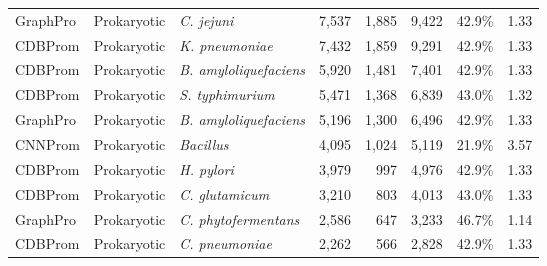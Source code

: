 \begin{longtable}{@{}lllrrrrr@{}}
GraphPro & Prokaryotic & \textit{C. jejuni} & 7,537 & 1,885 & 9,422 & 42.9\% & 1.33 \\
CDBProm & Prokaryotic & \textit{K. pneumoniae} & 7,432 & 1,859 & 9,291 & 42.9\% & 1.33 \\
CDBProm & Prokaryotic & \textit{B. amyloliquefaciens} & 5,920 & 1,481 & 7,401 & 42.9\% & 1.33 \\
CDBProm & Prokaryotic & \textit{S. typhimurium} & 5,471 & 1,368 & 6,839 & 43.0\% & 1.32 \\
GraphPro & Prokaryotic & \textit{B. amyloliquefaciens} & 5,196 & 1,300 & 6,496 & 42.9\% & 1.33 \\
CNNProm & Prokaryotic & \textit{Bacillus} & 4,095 & 1,024 & 5,119 & 21.9\% & 3.57 \\
CDBProm & Prokaryotic & \textit{H. pylori} & 3,979 & 997 & 4,976 & 42.9\% & 1.33 \\
CDBProm & Prokaryotic & \textit{C. glutamicum} & 3,210 & 803 & 4,013 & 43.0\% & 1.33 \\
GraphPro & Prokaryotic & \textit{C. phytofermentans} & 2,586 & 647 & 3,233 & 46.7\% & 1.14 \\
CDBProm & Prokaryotic & \textit{C. pneumoniae} & 2,262 & 566 & 2,828 & 42.9\% & 1.33 \\
\end{longtable}
\endgroup
